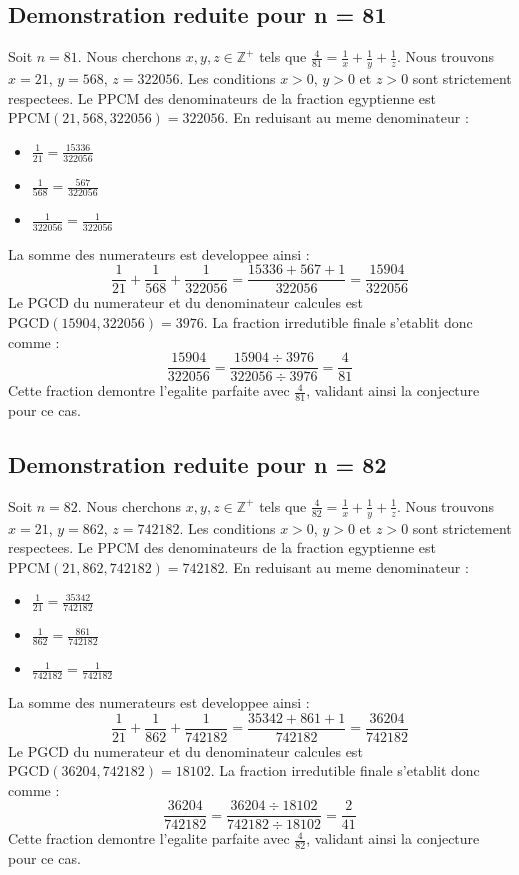\documentclass[11pt,a4paper]{article}
\begin{document}
\subsection{Demonstration reduite pour n = 81}
Soit $n = 81$. Nous cherchons $x, y, z \in \mathbb{Z}^{+}$ tels que $\frac{4}{81} = \frac{1}{x} + \frac{1}{y} + \frac{1}{z}$.
Nous trouvons $x = 21$, $y = 568$, $z = 322056$.
Les conditions $x > 0$, $y > 0$ et $z > 0$ sont strictement respectees.
Le PPCM des denominateurs de la fraction egyptienne est $\text{PPCM}(21, 568, 322056) = 322056$.
En reduisant au meme denominateur :
\begin{itemize}
    \item $\frac{1}{21} = \frac{15336}{322056}$
    \item $\frac{1}{568} = \frac{567}{322056}$
    \item $\frac{1}{322056} = \frac{1}{322056}$
\end{itemize}
La somme des numerateurs est developpee ainsi :
$$ \frac{1}{21} + \frac{1}{568} + \frac{1}{322056} = \frac{15336 + 567 + 1}{322056} = \frac{15904}{322056} $$
Le PGCD du numerateur et du denominateur calcules est $\text{PGCD}(15904, 322056) = 3976$.
La fraction irredutible finale s'etablit donc comme :
$$ \frac{15904}{322056} = \frac{15904 \div 3976}{322056 \div 3976} = \frac{4}{81} $$
Cette fraction demontre l'egalite parfaite avec $\frac{4}{81}$, validant ainsi la conjecture pour ce cas.

\subsection{Demonstration reduite pour n = 82}
Soit $n = 82$. Nous cherchons $x, y, z \in \mathbb{Z}^{+}$ tels que $\frac{4}{82} = \frac{1}{x} + \frac{1}{y} + \frac{1}{z}$.
Nous trouvons $x = 21$, $y = 862$, $z = 742182$.
Les conditions $x > 0$, $y > 0$ et $z > 0$ sont strictement respectees.
Le PPCM des denominateurs de la fraction egyptienne est $\text{PPCM}(21, 862, 742182) = 742182$.
En reduisant au meme denominateur :
\begin{itemize}
    \item $\frac{1}{21} = \frac{35342}{742182}$
    \item $\frac{1}{862} = \frac{861}{742182}$
    \item $\frac{1}{742182} = \frac{1}{742182}$
\end{itemize}
La somme des numerateurs est developpee ainsi :
$$ \frac{1}{21} + \frac{1}{862} + \frac{1}{742182} = \frac{35342 + 861 + 1}{742182} = \frac{36204}{742182} $$
Le PGCD du numerateur et du denominateur calcules est $\text{PGCD}(36204, 742182) = 18102$.
La fraction irredutible finale s'etablit donc comme :
$$ \frac{36204}{742182} = \frac{36204 \div 18102}{742182 \div 18102} = \frac{2}{41} $$
Cette fraction demontre l'egalite parfaite avec $\frac{4}{82}$, validant ainsi la conjecture pour ce cas.
\end{document}
